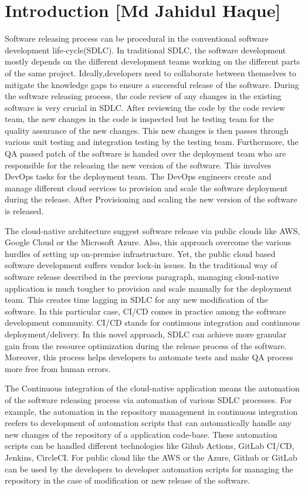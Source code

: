 
\section{Introduction [Md Jahidul Haque]}
Software  releasing  process  can  be  procedural  in  the  conventional  software  development life-cycle(SDLC). In traditional SDLC, the software development mostly depends on the different development teams working on the different parts of the same project.  Ideally,developers  need  to  collaborate  between  themselves  to  mitigate  the  knowledge  gaps  to ensure a successful release of the software.  During the software releasing process, the code review of any changes in the existing software is very crucial in SDLC. After reviewing the code by the code review team, the new changes in the code is inspected but he testing team for the quality assurance of the new changes.  This new changes is then passes through various unit testing and integration testing by the testing team.  Furthermore,  the QA passed  patch  of  the  software  is  handed  over  the  deployment  team  who  are  responsible for  the  releasing  the  new  version  of  the  software.   This  involves  DevOps  tasks  for  the deployment team.  The DevOps engineers create and manage different cloud services to provision and scale the software deployment during the release.  After Provisioning and scaling the new version of the software is released.

The cloud-native architecture suggest software release via public clouds like AWS, Google Cloud or the Microsoft Azure. Also, this approach overcome the various hurdles of setting up on-premise infrastructure. Yet, the public cloud based software development  suffers vendor lock-in issues. In the traditional way of software release described in the previous paragraph, managing cloud-native application is much tougher to provision and scale manually for the deployment team. This creates time lagging in SDLC for any new modification of the software. In this particular case, CI/CD comes in practice among the software development community. CI/CD stands for continuous integration and continuous deployment/delivery. In this novel approach, SDLC can achieve more granular gain from the resource optimization during the release process of the software. Moreover, this process helps developers to automate tests and make QA process more free from human errors. 


The Continuous integration of the cloud-native application means the automation of the software releasing process via automation of various SDLC processes. For example, the automation in the repository management in continuous integration reefers to development of automation scripts that can automatically handle any new changes of the repository of a application code-base. These automation scripts can be handled different technologies like Gihub Actions, GitLab CI/CD, Jenkins, CircleCI. For public cloud like the AWS or the Azure, Github or GitLab can be used by the developers to developer automation scripts for managing the repository in the case of modification or new release of the software.

